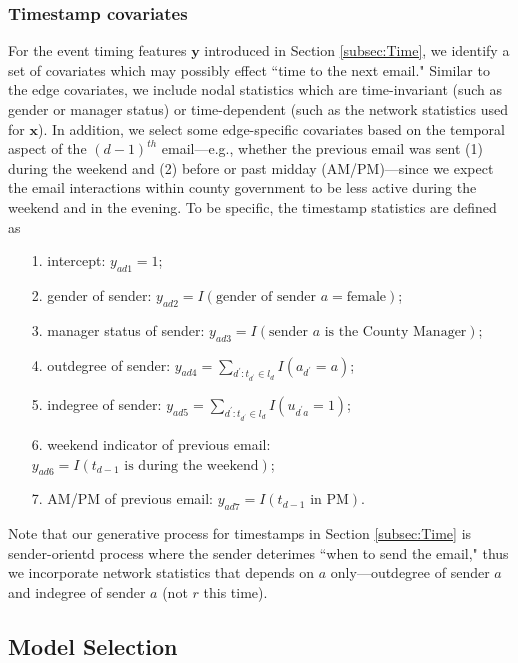 \documentclass[ba]{imsart}
\numberwithin{equation}{section}
\theoremstyle{plain}
\begin{document}
 	    	   \subsubsection{Timestamp covariates}
 	   For the event timing features $\boldsymbol{y}$ introduced in Section \ref{subsec:Time}, we identify a set of covariates which may possibly effect ``time to the next email." Similar to the edge covariates, we include nodal statistics which are time-invariant (such as gender or manager status) or time-dependent (such as the network statistics used for $\boldsymbol{x}$). In addition, we select some edge-specific covariates based on the temporal aspect of the $(d-1)^{th}$ email---e.g., whether the previous email was sent (1) during the weekend and (2) before or past midday (AM/PM)---since we expect the email interactions within county government to be less active during the weekend and in the evening. To be specific, the timestamp statistics are defined as
 	   \begin{itemize}
 	   	\item[1.] intercept: ${y}_{ad1} =1$;
 	   \item[2.] gender of sender: ${y}_{ad2}=I(\mbox{gender of sender }a= \mbox{female})$;
 	   \item[3.] manager status of sender: ${y}_{ad3}=I(\mbox{sender }a \mbox{ is the County Manager})$;
 	   	\item[4.] outdegree of sender: ${y}_{ad4} =\sum_{d^\prime: t_{d^\prime} \in l_d} I(a_{d^\prime} = a)$;
 	   	\item[5.] indegree of sender: ${y}_{ad5}=\sum_{d^\prime: t_{d^\prime} \in l_d} I(u_{d^\prime a} = 1)$;
 	   	\item[6.] weekend indicator of previous email: ${y}_{ad6} = I(t_{d-1} \mbox{ is during the } \mbox{weekend})$;
 	   	\item[7.] AM/PM of previous email: ${y}_{ad7}= I(t_{d-1} \mbox{ in } \mbox{PM})$.
 	   \end{itemize}
 	   Note that our generative process for timestamps in Section \ref{subsec:Time} is sender-orientd process where the sender deterimes ``when to send the email," thus we incorporate network statistics that depends on $a$ only---outdegree of sender $a$ and indegree of sender $a$ (not $r$ this time).

	\subsection{Model Selection}\label{subsec:Experiment_email}
	
\end{document}
